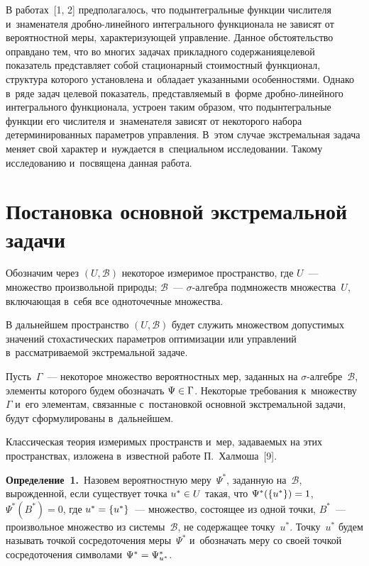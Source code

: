 \begin{multicols}{2}
     В работах~[1, 2] предполагалось, что подынтегральные функции 
числителя и~знаменателя 
     дроб\-но-ли\-ней\-но\-го интегрального функционала не зависят от 
вероятностной меры, характеризующей управ\-ле\-ние. Данное обстоятельство 
оправдано тем, что во многих задачах прикладного содержания\linebreak целевой 
показатель пред\-став\-ля\-ет собой стационарный стоимостный функционал, 
структура которого установлена и~обладает указанными особенностями. 
Однако в~ряде задач целевой показатель, 
представляемый в~форме дроб\-но-ли\-ней\-но\-го интегрального функционала, 
устроен таким образом, что подынтегральные функции его чис\-ли\-те\-ля 
и~знаменателя зависят от некоторого набора детерминированных па\-ра\-мет\-ров 
управления. В~этом случае экстремальная задача меняет свой характер 
и~нуж\-да\-ет\-ся в~специальном исследовании. Такому исследованию 
и~посвящена данная работа.

\vspace*{-6pt}

\section{Постановка основной экстремальной задачи}

\vspace*{-2pt}

     Обозначим через $(U,\mathcal{B})$ некоторое измеримое пространство, 
где  
$U$~--- множество произвольной природы; $\mathcal{B}$~--- $\sigma$-ал\-геб\-ра 
подмножеств множества~$U$, вклю\-ча\-ющая в~себя все одноточечные 
множества.
     
     В дальнейшем пространство $(U,\mathcal{B})$ будет служить 
множеством допустимых значений стохастических параметров оптимизации или 
управлений в~рас\-смат\-ри\-ва\-емой экстремальной задаче.
     
     Пусть~$\Gamma$~--- некоторое множество вероятностных мер, заданных 
на  
$\sigma$-ал\-геб\-ре~$\mathcal{B}$, элементы которого будем обозначать 
$\Psi\hm\in\Gamma$. Некоторые требования к~множеству~$\Gamma$ и~его 
элементам, связанные с~постановкой основной экстремальной задачи, будут 
сформулированы в~дальнейшем.
      
     Классическая теория измеримых пространств и~мер, за\-да\-ва\-емых на этих 
пространствах, изложена в~известной работе П.~Халмоша~[9].
     
     \smallskip
     
     \noindent
     \textbf{Определение~1.}\ Назовем вероятностную меру~$\Psi^*$, 
заданную на~$\mathcal{B}$, вырожденной, если существует точка $u^*\hm\in U$ 
такая, что $\Psi^*(\{u^*\})\hm=1$, $\Psi^*(B^*)=0$, где $u^*\hm= \{ 
u^*\}$~--- множество, со\-сто\-ящее из одной точ\-ки, $B^*$~--- произвольное 
множество из системы~$\mathcal{B}$, не содержащее точку~$u^*$. 
Точку~$u^*$ будем называть точ\-кой сосредоточения меры~$\Psi^*$ 
и~обозначать меру со своей точ\-кой сосредоточения символами $\Psi^*\hm= 
\Psi^*_{u^*}$.
     

\end{multicols}
